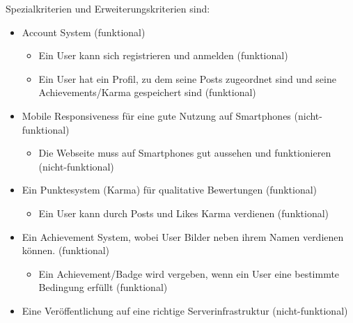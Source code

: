 Spezialkriterien und Erweiterungskriterien sind:
\begin{itemize}
    \item Account System (funktional)
    \begin{itemize}
        \item Ein User kann sich registrieren und anmelden (funktional)
        \item Ein User hat ein Profil, zu dem seine Posts zugeordnet sind und seine Achievements/Karma gespeichert sind (funktional)
    \end{itemize} 
    \item Mobile Responsiveness für eine gute Nutzung auf Smartphones (nicht-funktional)
    \begin{itemize}
        \item Die Webseite muss auf Smartphones gut aussehen und funktionieren (nicht-funktional)
    \end{itemize}
    \item Ein Punktesystem (Karma) für qualitative Bewertungen (funktional)
    \begin{itemize}
        \item Ein User kann durch Posts und Likes Karma verdienen (funktional)
    \end{itemize}
    \item Ein Achievement System, wobei User Bilder neben ihrem Namen verdienen können. (funktional)
    \begin{itemize}
        \item Ein Achievement/Badge wird vergeben, wenn ein User eine bestimmte Bedingung erfüllt (funktional)
    \end{itemize}
    \item Eine Veröffentlichung auf eine richtige Serverinfrastruktur (nicht-funktional)
\end{itemize}

